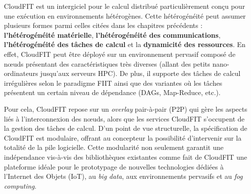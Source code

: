 

\begin{resume}
	
	CloudFIT est un intergiciel pour le calcul distribué particulièrement conçu pour une exécution en environnements hétérogènes. Cette hétérogénéité peut assumer plusieurs formes parmi celles citées dans les chapitres précédents : \textbf{l'hétérogénéité matérielle}, \textbf{l'hétérogénéité des communications},\textbf{ l'hétérogénéité des tâches de calcul} et la \textbf{dynamicité des ressources}. En effet, CloudFIT peut être déployé sur un environnement pervasif composé de n{\oe}uds présentant des caractéristiques très diverses (allant des petits nano-ordinateurs jusqu'aux serveurs HPC). De plus, il supporte des tâches de calcul irrégulières selon le paradigme FIIT ainsi que des variantes où les tâches présentent un certain niveau de dépendance (DAGs, Map-Reduce, etc.).
%	
  
	Pour cela, CloudFIT repose sur un \textit{overlay} pair-à-pair (P2P) qui gère les aspects liés à l'interconnexion des n{\oe}uds, alors que les services CloudFIT s'occupent de la gestion des tâches de calcul. D'un point de vue structurelle, la spécification de CloudFIT est modulaire, offrant au concepteur la possibilité d'intervenir sur la totalité de la pile logicielle. Cette modularité non seulement garantit une indépendance vis-à-vis des bibliothèques existantes comme fait de CloudFIT une plateforme idéale pour le prototypage de nouvelles technologies dédiées à l'Internet des Objets (IoT), au \textit{big data}, aux environnements pervasifs et au \textit{fog computing}.
	

\end{resume}
